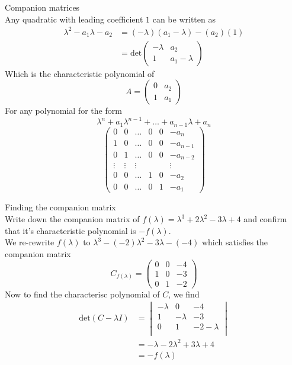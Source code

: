 \documentclass[journal, letterpaper]{IEEEtran}
\begin{document}
    \begin{myboxr}{Companion matrices} \\ 
        Any quadratic with leading coefficient $1$ can be written as
        \begin{align*}
        \lambda^2 - a_1\lambda - a_2  &= (-\lambda)(a_1 - \lambda) - (a_2)(1) \\ &= \text{det}\begin{pmatrix}
            -\lambda & a_2 \\ 1 & a_1 - \lambda
        \end{pmatrix}
        \end{align*}
        Which is the characteristic polynomial of
        $$ A = \begin{pmatrix}
            0 & a_2 \\ 1 & a_1
        \end{pmatrix}$$
        For any polynomial for the form
        $$ \lambda^n + a_1\lambda^{n-1} + \dots + a_{n-1}\lambda + a_n$$
        $$ \begin{pmatrix}
            0 & 0 & \dots & 0 & 0 & -a_n \\ 
            1 & 0 & \dots & 0 & 0 & -a_{n-1} \\ 
            0 & 1 & \dots & 0 & 0 & -a_{n-2} \\ 
            \vdots & \vdots & \vdots & & & \vdots \\ 
            0 & 0 &  \dots & 1 & 0 & -a_2 \\ 
            0 & 0 & \dots & 0 & 1 & -a_1
        \end{pmatrix}$$
    \end{myboxr}
    \begin{myboxg}{Finding the companion matrix} \\ 
        Write down the companion matrix of $f(\lambda) = \lambda^3 + 2\lambda^2 - 3\lambda + 4$ and confirm that it's characteristic polynomial is $-f(\lambda)$.
        \newline \\ 
        We re-rewrite $f(\lambda)$ to $\lambda^3 - (-2)\lambda^2 - 3\lambda -(-4)$ which satisfies the companion matrix 
        $$ 
            C_{f(\lambda)} = \begin{pmatrix}
                0 & 0 & -4 \\ 1 & 0 & -3 \\ 0 & 1 & -2
            \end{pmatrix}
        $$
        Now to find the characterisc polynomial of $C$, we find
        \begin{align*}
            \text{det}(C - \lambda I) &= \begin{vmatrix}
            -\lambda & 0 & -4 \\ 1 & -\lambda & -3 \\ 0 & 1 & -2 - \lambda \\ 
        \end{vmatrix} \\
            &= -\lambda - 2\lambda^2 + 3\lambda + 4 \\ 
            &= -f(\lambda)
        \end{align*}
    \end{myboxg}
\end{document}

